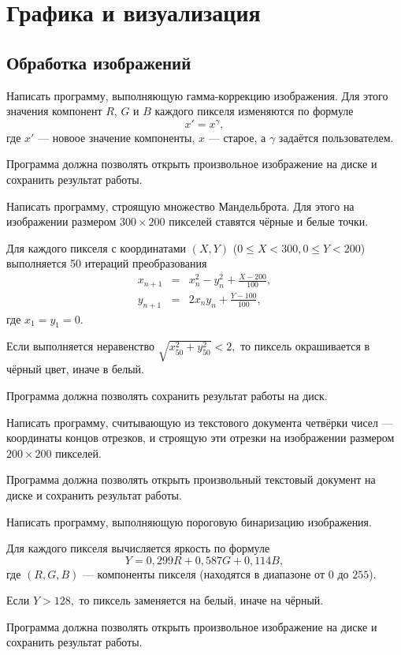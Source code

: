\section{Графика и визуализация}

\subsection{Обработка изображений}

\task Написать программу, выполняющую гамма-коррекцию изображения. Для
этого значения компонент $R$, $G$ и $B$ каждого пикселя изменяются по
формуле
\[
x'=x^{\gamma},
\]
где $x'$ — новоое значение компоненты, $x$ — старое, а $\gamma$
задаётся пользователем.

Программа должна позволять открыть произвольное изображение на диске и
сохранить результат работы.

\task Написать программу, строящую множество Мандельброта. Для этого
на изображении размером $300 \times 200$ пикселей ставятся чёрные и
белые точки.

Для каждого пикселя с координатами $(X, Y)$
($0\leqslant X < 300, 0\leqslant Y < 200$) выполняется 50 итераций
преобразования
\begin{eqnarray*}
x_{n+1} &=& x_n^2 - y_n^2 + \frac{X - 200}{100},\\
y_{n+1} &=& 2 x_n y_n + \frac{Y-100}{100},
\end{eqnarray*}
где $x_1=y_1=0.$

Если выполняется неравенство $\sqrt{x_{50}^2 + y_{50}^2} < 2,$ то
пиксель окрашивается в чёрный цвет, иначе в белый.

Программа должна позволять сохранить результат работы на диск.

\task Написать программу, считывающую из текстового документа четвёрки
чисел — координаты концов отрезков, и строящую эти отрезки на изображении
размером $200\times 200$ пикселей.

Программа должна позволять открыть произвольный текстовый документ на
диске и сохранить результат работы.

\task Написать программу, выполняющую пороговую бинаризацию
изображения.

Для каждого пикселя вычисляется яркость по формуле
\[
Y = 0{,}299 R + 0{,}587 G + 0{,}114 B,
\]
где $(R, G, B)$ — компоненты пикселя (находятся в диапазоне от $0$ до
$255$).

Если $Y > 128,$ то пиксель заменяется на белый, иначе на чёрный.

Программа должна позволять открыть произвольное изображение на диске и
сохранить результат работы.

